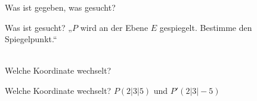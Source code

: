 \setcounter{aufgabe}{8}

\begin{aufgabe}{Was ist gegeben, was gesucht?}
\begin{teile}
\teil Was ist gesucht? „$P$ wird an der Ebene $E$ gespiegelt. Bestimme den Spiegelpunkt.“ \\  \\ 
\end{teile}
\end{aufgabe}

\begin{aufgabe}{Welche Koordinate wechselt?}
\begin{teile}
\teil Welche Koordinate wechselt? $P(2 | 3 | 5)$ und $P'(2 | 3 | -5)$ \\  \\  \\  \\ 
\end{teile}
\end{aufgabe}

